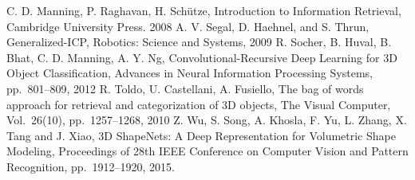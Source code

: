 \documentclass[letterpaper,10pt,conference]{ieeeconf}  %
\begin{document}
\begin{thebibliography}{99}
 C. D. Manning, P. Raghavan, H. Sch\"{u}tze, Introduction to Information Retrieval, Cambridge University Press. 2008
 A. V. Segal, D. Haehnel, and S. Thrun, Generalized-ICP, Robotics: Science and Systems, 2009
R. Socher, B. Huval, B. Bhat, C. D. Manning, A. Y. Ng, Convolutional-Recursive Deep Learning for 3D Object Classification, Advances in Neural Information Processing Systems, pp.~801--809, 2012
R. Toldo, U. Castellani, A. Fusiello, The bag of words approach for retrieval and categorization of 3D objects, The Visual Computer, Vol.~26(10), pp.~1257--1268, 2010
 Z. Wu, S. Song, A. Khosla, F. Yu, L. Zhang, X. Tang and J. Xiao, 3D ShapeNets: A Deep Representation for Volumetric Shape Modeling, Proceedings of 28th IEEE Conference on Computer Vision and Pattern Recognition, pp.~1912--1920, 2015.
\end{thebibliography}
\end{document}
